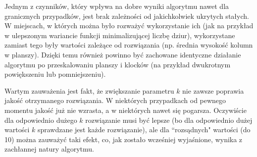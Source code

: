 \documentclass{article}
\begin{document}
Jednym z czynników, który wpływa na dobre wyniki algorytmu nawet dla granicznych przypadków, jest brak zależności od jakichkolwiek ukrytych stałych. W miejscach, w których można było rozważyć wykorzystanie ich (jak na przykład w ulepszonym wariancie funkcji minimalizującej liczbę dziur), wykorzystane zamiast tego były wartości zależące od rozwiązania (np. średnia wysokość kolumn w planszy). Dzięki temu również powinno być zachowane identyczne działanie algorytmu po przeskalowaniu planszy i klocków (na przykład dwukrotnym powiększeniu lub pomniejszeniu).

Wartym zauważenia jest fakt, że zwiększanie parametru $k$ nie zawsze poprawia jakość otrzymanego rozwiązania. W niektórych przypadkach od pewnego momentu jakość już nie wzrasta, a w niektórych nawet się pogarsza. Oczywiście dla odpowiednio dużego $k$ rozwiązanie musi być lepsze (bo dla odpowiednio dużej wartości $k$ sprawdzane jest każde rozwiązanie), ale dla ``rozsądnych" wartości (do 10) można zauważyć taki efekt, co, jak zostało wcześniej wyjaśnione, wynika z zachłannej natury algorytmu.
\end{document}
